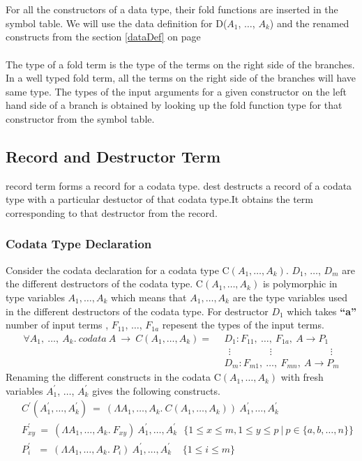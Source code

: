 \documentclass[11pt]{article}
\begin{document}
~~\\~~\\
For all the constructors of a data type, their fold functions are  inserted in the symbol table. We will use the data definition for D($A_1$, $\ldots$, $A_k$) and the renamed constructs from the section \ref{dataDef} on page \pageref{dataDef}
~~\\~~\\
The type of a {\sf fold} term is the type of the terms on the right side of the branches. In a well typed {\sf fold} term, all the terms on the right side of the branches will have same type. The types of the input arguments for a given constructor on the left hand side of a branch is obtained by looking up the fold function type for that constructor from the symbol table. 
\subsection {Record and Destructor Term}
{\sf record } term forms a record for a codata type. {\sf dest} destructs a record of a codata type with a particular destuctor of that codata type.It obtains the term corresponding to that destructor from the record.
\subsubsection {Codata Type Declaration}
Consider the codata declaration for a codata type C$(A_1,\ldots,A_k)$. $D_1$, $\ldots$, $D_m$ are the different destructors of the codata type. C$(A_1,\ldots,A_k)$  is polymorphic in type variables $A_1,\ldots,A_k$ which means that $A_1,
\ldots,A_k$ are the type variables used in the different destructors of the codata type. For destructor $D_1$ which takes {\bf ``a''} number of input terms , $F_{11}$, $\ldots$, $F_{1a}$ repesent the types of the input terms.
\begin{align*} 
\forall A_1,~ \ldots,~A_k.~codata~ A ~\to~ C (A_1,\ldots,A_k) =
 & ~~ D_1 : F_{11},~ \ldots, ~ F_{1a},~A \to P_1 \\
 & ~~~~ \vdots \qquad\qquad \vdots \qquad\qquad\qquad \vdots \\ 
 & ~~ D_m : F_{m1} ,~ \ldots, ~ F_{mn},~A \to P_m
\end{align*}
Renaming the different constructs in the codata C$(A_1,\ldots,A_k)$ with fresh variables $A_1^{\prime}$, $\ldots$, $A_k^{\prime}$ gives the following constructs. 
\begin{align*}
 & ~~ C^{\prime}(A_1^\prime,\ldots,A_k^\prime)~ = ~(\Lambda A_1,\ldots,A_k.~ C (A_1,\ldots,A_k))~A_1^{\prime},\ldots,A_k^{\prime}\\ 
 & ~~ F_{xy}^\prime ~ =~ (\Lambda A_1,\ldots,A_k.~F_{xy})~A_1^{\prime},\ldots,A_k^{\prime} 
 ~~~  \{1 \leq x \leq m,1 \leq y \leq p ~|~ p \in \{a,b,\ldots,n\} \} \\
 & ~~ P_{i}^\prime ~~~=~ (\Lambda A_1,\ldots,A_k.~ P_i)~A_1^{\prime},\ldots,A_k^{\prime} 
  ~~~~~ \{ 1 \leq i \leq m \} \\
 \end{align*}
\end{document}
